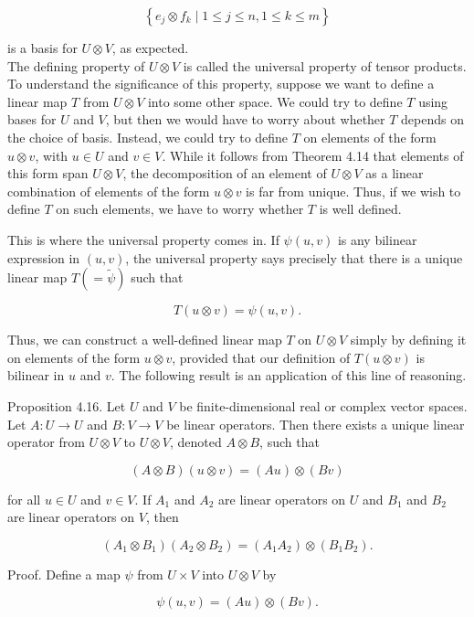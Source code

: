 \documentclass[10pt, letterpaper]{article}
\begin{document}
$$
\left\{e_{j} \otimes f_{k} \mid 1 \leq j \leq n, 1 \leq k \leq m\right\}
$$

is a basis for $U \otimes V$, as expected.\\
The defining property of $U \otimes V$ is called the universal property of tensor products. To understand the significance of this property, suppose we want to define a linear map $T$ from $U \otimes V$ into some other space. We could try to define $T$ using bases for $U$ and $V$, but then we would have to worry about whether $T$ depends on the choice of basis. Instead, we could try to define $T$ on elements of the form $u \otimes v$, with $u \in U$ and $v \in V$. While it follows from Theorem 4.14 that elements of this form span $U \otimes V$, the decomposition of an element of $U \otimes V$ as a linear combination of elements of the form $u \otimes v$ is far from unique. Thus, if we wish to define $T$ on such elements, we have to worry whether $T$ is well defined.

This is where the universal property comes in. If $\psi(u, v)$ is any bilinear expression in $(u, v)$, the universal property says precisely that there is a unique linear map $T(=\tilde{\psi})$ such that

$$
T(u \otimes v)=\psi(u, v) .
$$

Thus, we can construct a well-defined linear map $T$ on $U \otimes V$ simply by defining it on elements of the form $u \otimes v$, provided that our definition of $T(u \otimes v)$ is bilinear in $u$ and $v$. The following result is an application of this line of reasoning.

Proposition 4.16. Let $U$ and $V$ be finite-dimensional real or complex vector spaces. Let $A: U \rightarrow U$ and $B: V \rightarrow V$ be linear operators. Then there exists a unique linear operator from $U \otimes V$ to $U \otimes V$, denoted $A \otimes B$, such that

$$
(A \otimes B)(u \otimes v)=(A u) \otimes(B v)
$$

for all $u \in U$ and $v \in V$. If $A_{1}$ and $A_{2}$ are linear operators on $U$ and $B_{1}$ and $B_{2}$ are linear operators on $V$, then

$$
\left(A_{1} \otimes B_{1}\right)\left(A_{2} \otimes B_{2}\right)=\left(A_{1} A_{2}\right) \otimes\left(B_{1} B_{2}\right) .
$$

Proof. Define a map $\psi$ from $U \times V$ into $U \otimes V$ by

$$
\psi(u, v)=(A u) \otimes(B v) .
$$
\end{document}
